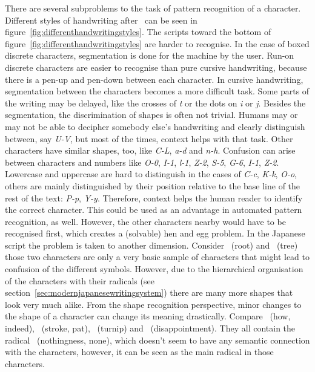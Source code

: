 There are several subproblems to the task of pattern recognition of a character.
Different styles of handwriting after~ can be seen in 
figure~\ref{fig:differenthandwritingstyles}.
The scripts toward the bottom of figure~\ref{fig:differenthandwritingstyles} 
are harder to recognise. In the case of boxed discrete characters, segmentation 
is done for the machine by the user. Run-on discrete characters are easier to 
recognise than pure cursive handwriting, because there is a pen-up and 
pen-down between each character. In cursive handwriting, segmentation 
between the characters becomes a more difficult task. Some parts of the writing
may be delayed, like the crosses of \emph{t} or the dots on \emph{i} or \emph{j}.
Besides the segmentation, the discrimination of shapes is often not trivial.
Humans may or may not be able to decipher somebody else's handwriting and clearly
distinguish between, say \emph{U-V}, but most of the times, context helps with 
that task. Other characters have similar shapes, too, like \emph{C-L}, \emph{a-d}
and \emph{n-h}. Confusion can arise between characters and numbers like 
\emph{O-0}, \emph{I-1}, \emph{l-1}, \emph{Z-2}, \emph{S-5}, \emph{G-6}, 
\emph{I-1}, \emph{Z-2}. Lowercase and uppercase are hard to distinguish in the
cases of \emph{C-c}, \emph{K-k}, \emph{O-o}, others are mainly distinguished 
by their position relative to the base line of the rest of the text: 
\emph{P-p}, \emph{Y-y}. Therefore, context helps the human reader to identify
the correct character. This could be used as an advantage in automated pattern
recognition, as well. However, the other characters nearby would have to be
recognised first, which creates a (solvable) hen and egg problem.
In the Japanese script the problem is taken to another dimension. 
Consider ~(root) and ~(tree) those two characters are only a 
very basic sample of characters that might lead to confusion of the different 
symbols. However, due to the hierarchical organisation of the characters 
with their radicals (see section~\ref{sec:modernjapanesewritingsystem}) there 
are many more shapes that look very much alike. From the shape recognition 
perspective, minor changes to the shape of a character can change its meaning 
drastically.
Compare ~(how, indeed), ~(stroke, pat), ~(turnip) and
~(disappointment). They all contain the radical 
~(nothingness, none), which doesn't seem to have any semantic connection
with the characters, however, it can be seen as the main radical in those 
characters.

